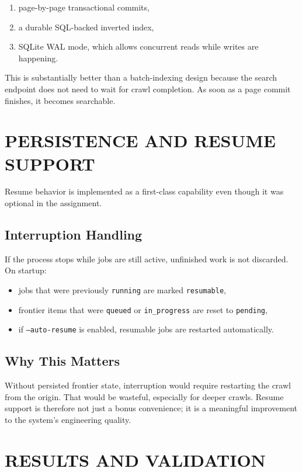 \documentclass[pdftex,12pt,a4paper]{article}
\begin{document}
\begin{enumerate}
    \item page-by-page transactional commits,
    \item a durable SQL-backed inverted index,
    \item SQLite WAL mode, which allows concurrent reads while writes are happening.
\end{enumerate}

This is substantially better than a batch-indexing design because the search endpoint does not need to wait for crawl completion. As soon as a page commit finishes, it becomes searchable.

\section{PERSISTENCE AND RESUME SUPPORT}
\label{sec:persistence_resume}

Resume behavior is implemented as a first-class capability even though it was optional in the assignment.

\subsection{Interruption Handling}

If the process stops while jobs are still active, unfinished work is not discarded. On startup:

\begin{itemize}
    \item jobs that were previously \texttt{running} are marked \texttt{resumable},
    \item frontier items that were \texttt{queued} or \texttt{in\_progress} are reset to \texttt{pending},
    \item if \texttt{--auto-resume} is enabled, resumable jobs are restarted automatically.
\end{itemize}

\subsection{Why This Matters}

Without persisted frontier state, interruption would require restarting the crawl from the origin. That would be wasteful, especially for deeper crawls. Resume support is therefore not just a bonus convenience; it is a meaningful improvement to the system's engineering quality.

\section{RESULTS AND VALIDATION}
\label{sec:results}
\end{document}
